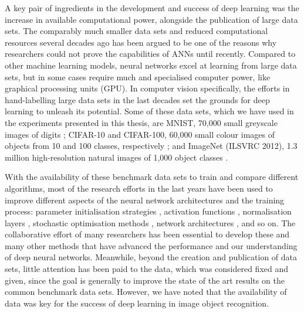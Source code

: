 {A key pair of ingredients in the development and success of deep learning was the increase in available computational power, alongside the publication of large data sets. The comparably much smaller data sets and reduced computational resources several decades ago has been argued to be one of the reasons why researchers could not prove the capabilities of ANNs until recently. Compared to other machine learning models, neural networks excel at learning from large data sets, but in some cases require much and specialised computer power, like graphical processing units (GPU). In computer vision specifically, the efforts in hand-labelling large data sets in the last decades set the grounds for deep learning to unleash its potential. Some of these data sets, which we have used in the experiments presented in this thesis, are MNIST, 70,000 small greyscale images of digits \citep{lecun1998mnist}; CIFAR-10 and CIFAR-100, 60,000 small colour images of objects from 10 and 100 classes, respectively \citep{krizhevsky2009cifar}; and ImageNet (ILSVRC 2012), 1.3 million high-resolution natural images of 1,000 object classes \citep{russakovsky2015imagenet}.

With the availability of these benchmark data sets to train and compare different algorithms, most of the research efforts in the last years have been used to improve different aspects of the neural network architectures and the training process: parameter initialisation strategies \citep{glorot2010glorot, he2015he}, activation functions \citep{glorot2011relu}, normalisation layers \citep{ioffe2015batchnorm}, stochastic optimisation methods \citep{duchi2011adagrad, kingma2014adam}, network architectures \citep{springenberg2014allcnn, simonyan2014vgg, he2016resnet, huang2017densenet}, and so on. The collaborative effort of many researchers has been essential to develop these and many other methods that have advanced the performance and our understanding of deep neural networks. Meanwhile, beyond the creation and publication of data sets, little attention has been paid to the data, which was considered fixed and given, since the goal is generally to improve the state of the art results on the common benchmark data sets. However, we have noted that the availability of data was key for the success of deep learning in image object recognition.

}
